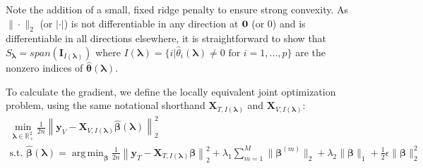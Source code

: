 \documentclass{statsoc}
\DeclareMathOperator*{\argmin}{arg\,min}
\begin{document}
Note the addition of a small, fixed ridge penalty to ensure strong convexity. As $\|\cdot\|_2$ (or $|\cdot|$) is not differentiable in any direction at ${\bf 0}$ (or $0$) and is differentiable in all directions elsewhere, it is straightforward to show that $S_{\boldsymbol \lambda} = span(\boldsymbol I_{I(\boldsymbol\lambda)})$ where $I(\boldsymbol\lambda) = \{i | \hat{\theta}_i(\boldsymbol\lambda) \ne 0 \text{ for } i=1,...,p \}$ are the nonzero indices of $\hat{\boldsymbol{\theta}}(\boldsymbol{\lambda})$.

To calculate the gradient, we define the locally equivalent joint optimization problem, using the same notational shorthand $\boldsymbol{X}_{T, I(\boldsymbol\lambda)}$ and $\boldsymbol{X}_{V, I(\boldsymbol\lambda)}$:
\begin{equation}
\begin{array}{c}
\min_{\boldsymbol{\lambda} \in \mathbb{R}^2_{+}} \frac{1}{2n} \left \| \boldsymbol{y}_V - \boldsymbol X_{V,I(\boldsymbol\lambda)} \hat{\boldsymbol\beta}(\boldsymbol{\lambda}) \right \|^2_2 \\
\text{s.t. }
\hat{\boldsymbol{\beta}}(\boldsymbol{\lambda}) = \argmin_{\boldsymbol \beta}
\frac{1}{2n} \left \| \boldsymbol{y}_T - \boldsymbol{X}_{T, I(\boldsymbol\lambda)} \boldsymbol \beta \right \|^2_2
+ \lambda_1 \sum_{m=1}^M \| \boldsymbol \beta^{(m)} \|_2
+ \lambda_2 \| \boldsymbol \beta \|_1
+ \frac{1}{2}\epsilon \| \boldsymbol \beta \|_2^2
\end{array}
\end{equation}

\end{document}
